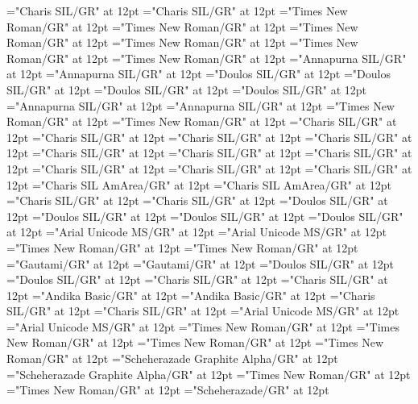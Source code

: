 \documentclass[a4paper]{article}
\begin{document}
\font\divqaaxtes="Charis SIL/GR" at 12pt
\font\spanqaaxtes="Charis SIL/GR" at 12pt
\font\divrme="Times New Roman/GR" at 12pt
\font\spanrme="Times New Roman/GR" at 12pt
\font\divru="Times New Roman/GR" at 12pt
\font\spanru="Times New Roman/GR" at 12pt
\font\divrwrArab="Times New Roman/GR" at 12pt
\font\spanrwrArab="Times New Roman/GR" at 12pt
\font\divrwrDeva="Annapurna SIL/GR" at 12pt
\font\spanrwrDeva="Annapurna SIL/GR" at 12pt
\font\divrwrfonipa="Doulos SIL/GR" at 12pt
\font\spanrwrfonipa="Doulos SIL/GR" at 12pt
\font\divrwrINfonipa="Doulos SIL/GR" at 12pt
\font\spanrwrINfonipa="Doulos SIL/GR" at 12pt
\font\divrwrIN="Annapurna SIL/GR" at 12pt
\font\spanrwrIN="Annapurna SIL/GR" at 12pt
\font\divsch="Times New Roman/GR" at 12pt
\font\spansch="Times New Roman/GR" at 12pt
\font\divsehZxxxxaudio="Charis SIL/GR" at 12pt
\font\spansehZxxxxaudio="Charis SIL/GR" at 12pt
\font\divseh="Charis SIL/GR" at 12pt
\font\spanseh="Charis SIL/GR" at 12pt
\font\divshhZxxxxaudio="Charis SIL/GR" at 12pt
\font\spanshhZxxxxaudio="Charis SIL/GR" at 12pt
\font\divshh="Charis SIL/GR" at 12pt
\font\spanshh="Charis SIL/GR" at 12pt
\font\divsrxQaaaxIPASIPA="Charis SIL/GR" at 12pt
\font\spansrxQaaaxIPASIPA="Charis SIL/GR" at 12pt
\font\divstp="Charis SIL AmArea/GR" at 12pt
\font\spanstp="Charis SIL AmArea/GR" at 12pt
\font\divswc="Charis SIL/GR" at 12pt
\font\spanswc="Charis SIL/GR" at 12pt
\font\divswvfonipaxetic="Doulos SIL/GR" at 12pt
\font\spanswvfonipaxetic="Doulos SIL/GR" at 12pt
\font\divswvfonipa="Doulos SIL/GR" at 12pt
\font\spanswvfonipa="Doulos SIL/GR" at 12pt
\font\divswv="Arial Unicode MS/GR" at 12pt
\font\spanswv="Arial Unicode MS/GR" at 12pt
\font\divta="Times New Roman/GR" at 12pt
\font\spanta="Times New Roman/GR" at 12pt
\font\divte="Gautami/GR" at 12pt
\font\spante="Gautami/GR" at 12pt
\font\divthfonipa="Doulos SIL/GR" at 12pt
\font\spanthfonipa="Doulos SIL/GR" at 12pt
\font\divth="Charis SIL/GR" at 12pt
\font\spanth="Charis SIL/GR" at 12pt
\font\divtpi="Andika Basic/GR" at 12pt
\font\spantpi="Andika Basic/GR" at 12pt
\font\divtr="Charis SIL/GR" at 12pt
\font\spantr="Charis SIL/GR" at 12pt
\font\divtvtDeva="Arial Unicode MS/GR" at 12pt
\font\spantvtDeva="Arial Unicode MS/GR" at 12pt
\font\divtvtLatnIN="Times New Roman/GR" at 12pt
\font\spantvtLatnIN="Times New Roman/GR" at 12pt
\font\divtvt="Times New Roman/GR" at 12pt
\font\spantvt="Times New Roman/GR" at 12pt
\font\divurArab="Scheherazade Graphite Alpha/GR" at 12pt
\font\spanurArab="Scheherazade Graphite Alpha/GR" at 12pt
\font\divurxind="Times New Roman/GR" at 12pt
\font\spanurxind="Times New Roman/GR" at 12pt
\font\divur="Scheherazade/GR" at 12pt
\end{document}
